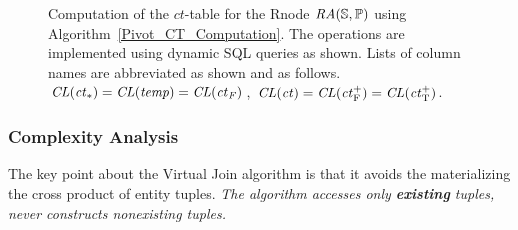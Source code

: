 \documentclass{vldb}
\newcommand{\ct}{\mathit{ct}}
\begin{document}
\begin{figure}[tb]
\begin{center}

\caption{Computation of the $\ct$-table for the Rnode $\mathit{RA}(\mathbb{S},\mathbb{P})$ using Algorithm~\ref{Pivot_CT_Computation}. The operations are implemented using dynamic SQL queries as shown. Lists of column names are abbreviated as shown and as follows.
$\ColumnList({\ct_{*}}) = \ColumnList({temp})=\ColumnList({\ct_{F}})$, 
$\ColumnList({\ct}) =  \ColumnList(\ct_{\false}^{+})  = \ColumnList(\ct_{\true}^{+}) $.
\label{fig:flow}}
\end{center}
\end{figure}

\subsubsection{Complexity Analysis} 

The key point about the Virtual Join algorithm %
is that it avoids the materializing the cross product of entity tuples. {\em The algorithm accesses  only \textbf{existing} tuples, never constructs nonexisting tuples.}
\end{document}
